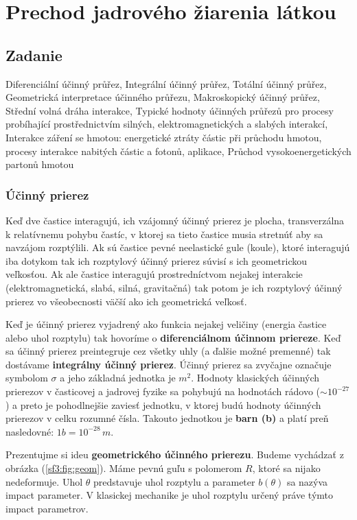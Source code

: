 \documentclass[../../main.tex]{subfiles}
\begin{document}
\chapter{Prechod jadrového žiarenia látkou}

\section{Zadanie}

Diferenciální účinný průřez, Integrální účinný průřez, Totální účinný průřez, Geometrická interpretace účinného průřezu, Makroskopický účinný průřez, Střední volná dráha interakce, Typické hodnoty účinných průřezů pro procesy probíhající prostřednictvím silných, elektromagnetických a slabých interakcí, Interakce záření se hmotou: energetické ztráty částic při průchodu hmotou, procesy interakce nabitých částic a fotonů, aplikace, Průchod vysokoenergetických partonů hmotou

\subsection{Účinný prierez}
Keď dve častice interagujú, ich vzájomný účinný prierez je plocha, transverzálna k relatívnemu pohybu častíc, v ktorej sa tieto častice musia stretnúť aby sa navzájom rozptýlili. Ak sú častice pevné neelastické gule (koule), ktoré interagujú iba dotykom tak ich rozptylový účinný prierez súvisí s ich geometrickou veľkosťou. Ak ale častice interagujú prostredníctvom nejakej interakcie (elektromagnetická, slabá, silná, gravitačná) tak potom je ich rozptylový účinný prierez vo všeobecnosti väčší ako ich geometrická veľkosť. 

Keď je účinný prierez vyjadrený ako funkcia nejakej veličiny (energia častice alebo uhol rozptylu) tak hovoríme o \textbf{diferenciálnom účinnom priereze}. Keď sa účinný prierez preintegruje cez všetky uhly (a ďalšie možné premenné) tak dostávame \textbf{integrálny účinný prierez}. Účinný prierez sa zvyčajne označuje symbolom $\sigma$ a jeho základná jednotka je $m^2$. Hodnoty klasických účinných prierezov v časticovej a jadrovej fyzike sa pohybujú na hodnotách rádovo ($\sim 10^{-27}$) a preto je pohodlnejšie zaviesť jednotku, v ktorej budú hodnoty účinných prierezov v celku rozumné čísla. Takouto jednotkou je \textbf{barn (b)} a platí preň nasledovné: $1b = 10^{-28}\,m$. 

Prezentujme si ideu \textbf{geometrického účinného prierezu}. Budeme vychádzať z obrázka (\ref{sf3:fig:geom}). Máme pevnú guľu s polomerom $R$, ktoré sa nijako nedeformuje. Uhol $\theta$ predstavuje uhol rozptylu a  parameter $b(\theta)$ sa nazýva impact parameter. V klasickej mechanike je uhol rozptylu určený práve týmto impact parametrov.
\end{document}
